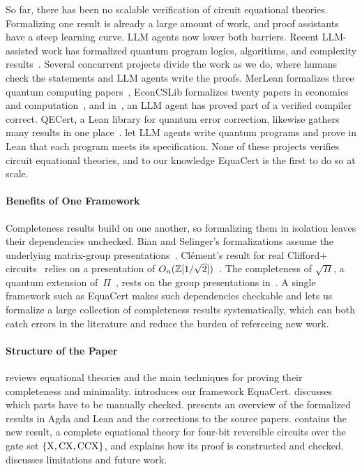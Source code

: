 \documentclass[acmsmall,screen,nonacm]{acmart}
\begin{document}
So far, there has been no scalable verification of circuit equational theories. Formalizing one result is already a large amount of work, and proof assistants have a steep learning curve. LLM agents now lower both barriers. Recent LLM-assisted work has formalized quantum program logics, algorithms, and complexity results~\cite{ren2026qedia,zhang2026leanquantumalg,lu2026formalflow}. Several concurrent projects divide the work as we do, where humans check the statements and LLM agents write the proofs. MerLean formalizes three quantum computing papers~\cite{ren2026merlean}, EconCSLib formalizes twenty papers in economics and computation~\cite{garg2026econcslib}, and in~\cite{paraskevopoulou2026compiler}, an LLM agent has proved part of a verified compiler correct. QECert, a Lean library for quantum error correction, likewise gathers many results in one place~\cite{he2026qecert}. \citet{shirobokov2026discovering} let LLM agents write quantum programs and prove in Lean that each program meets its specification. None of these projects verifies circuit equational theories, and to our knowledge EquaCert is the first to do so at scale.

\paragraph{Benefits of One Framework} Completeness results build on one another, so formalizing them in isolation leaves their dependencies unchecked. Bian and Selinger's formalizations assume the underlying matrix-group presentations~\cite{greylyn2014,bian2021un}. Cl\'ement's result for real Clifford+\CH{} circuits~\cite{clement2026realcliffordch} relies on a presentation of $O_n(\mathbb{Z}[1/\sqrt2])$~\cite{clement2019thesis,fang2026hadamard}. The completeness of $\sqrt{\Pi}$, a quantum extension of~$\Pi$~\cite{carette2024squareroots}, rests on the group presentations in~\cite{selinger2015clifford,bian2021un,bian2023cliffordt2}. A single framework such as EquaCert makes such dependencies checkable and lets us formalize a large collection of completeness results systematically, which can both catch errors in the literature and reduce the burden of refereeing new work.

\paragraph{Structure of the Paper}  reviews equational theories and the main techniques for proving their completeness and minimality.  introduces our framework EquaCert.  discusses which parts have to be manually checked.  presents an overview of the formalized results in Agda and Lean and the corrections to the source papers.  contains the new result, a complete equational theory for four-bit reversible circuits over the gate set $\{\mathrm{X},\mathrm{CX},\mathrm{CCX}\}$, and explains how its proof is constructed and checked.  discusses limitations and future work. 
\end{document}
